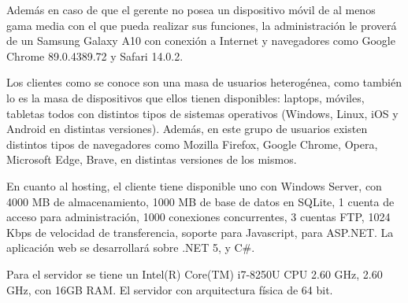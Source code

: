 Además en caso de que el gerente no posea un dispositivo móvil de al menos gama media con el que pueda realizar sus funciones, la administración le proverá de un Samsung Galaxy A10 con conexión a Internet y navegadores como Google Chrome 89.0.4389.72 y Safari 14.0.2. 

Los clientes como se conoce son una masa de usuarios heterogénea, como también lo es la masa de dispositivos que ellos tienen disponibles: laptops, móviles, tabletas todos con distintos tipos de sistemas operativos (Windows, Linux, iOS y Android en distintas versiones). Además, en este grupo de usuarios existen distintos tipos de navegadores como Mozilla Firefox, Google Chrome, Opera, Microsoft Edge, Brave, en distintas versiones de los mismos.

En cuanto al hosting, el cliente tiene disponible uno con Windows Server, con 4000 MB de almacenamiento, 1000 MB de base de datos en SQLite, 1 cuenta de acceso para administración, 1000 conexiones concurrentes, 3 cuentas FTP, 1024 Kbps de velocidad de transferencia, soporte para Javascript, para ASP.NET. La aplicación web se desarrollará sobre .NET 5, y C\#.

Para el servidor se tiene un Intel(R) Core(TM) i7-8250U CPU 2.60 GHz, 2.60 GHz, con 16GB RAM. El servidor con arquitectura física de 64 bit.
